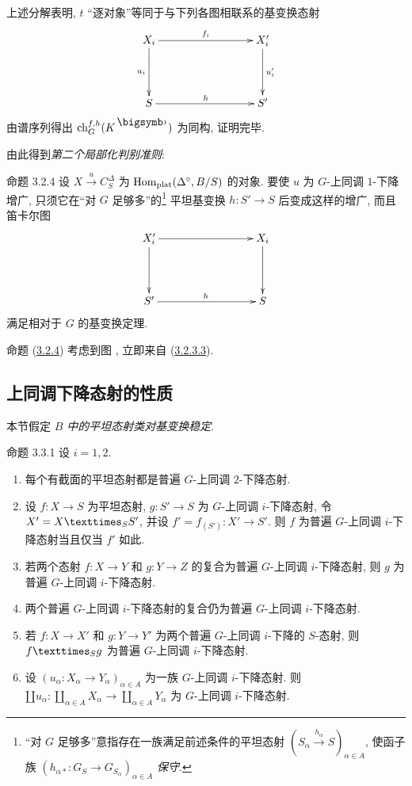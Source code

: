 上述分解表明, $t$ “逐对象”等同于与下列各图相联系的基变换态射
\[
\xymatrix@C=3cm@R=1.5cm{
X_i\ar[d]_{u_i}\ar[r]^{f_i}&X'_i\ar[d]^{u'_i}\\
S\ar[r]^{h}&S'
}
\]
由谱序列得出 $\ch_G^{f,h}(K^{\bigdot})$ 为同构, 证明完毕.

由此得到\emph{第二个局部化判别准则}:

\begin{enonce*}{命题 3.2.4}
设 $X\xrightarrow{u}C^{\Delta}_S$ 为 $\operatorname{Hom}_{\operatorname{plat}}(\Delta^{\circ},B/S)$ 的对象.
要使 $u$ 为 $G$-上同调 $1$-下降增广,
只须它在“对 $G$ 足够多”的\footnote{“对 $G$ 足够多”意指存在一族满足前述条件的平坦态射
$(S_{\alpha}\xrightarrow{h_{\alpha}}S)_{\alpha\in A}$,
使函子族 $(h_{\alpha\ast}:G_S\to G_{S_\alpha})_{\alpha\in A}$ \emph{保守}.}
平坦基变换 $h:S'\to S$ 后变成这样的增广, 而且笛卡尔图
\[
\xymatrix@C=3cm@R=1.5cm{
X'_i\ar[d]\ar[r]&X_i\ar[d]\\
S'\ar[r]^{h}&S
}
\]
满足相对于 $G$ 的基变换定理.
\end{enonce*}

命题\pageoriginale{} (\hyperref[Vbis.prop3.2.4]{3.2.4})
考虑到图 , 立即来自
(\hyperref[Vbis.lem3.2.3.3]{3.2.3.3}).

\subsection{上同调下降态射的性质}

本节假定 \emph{$B$ 中的平坦态射类对基变换稳定}.

\begin{enonce*}{命题 3.3.1}
设 $i=1,2$.
\begin{enumerate}
\renewcommand{\theenumi}{\alph{enumi}}
\renewcommand{\labelenumi}{\theenumi)}
\item 每个有截面的平坦态射都是普遍 $G$-上同调 $2$-下降态射.

\item 设 $f:X\to S$ 为平坦态射, $g:S'\to S$ 为 $G$-上同调 $i$-下降态射,
令 $X'=\fprod{X}{S'}{S}$, 并设 $f'=f_{(S')}:X'\to S'$.
则 $f$ 为普遍 $G$-上同调 $i$-下降态射当且仅当 $f'$ 如此.

\item 若两个态射 $f:X\to Y$ 和 $g:Y\to Z$ 的复合为普遍 $G$-上同调 $i$-下降态射,
则 $g$ 为普遍 $G$-上同调 $i$-下降态射.

\item 两个普遍 $G$-上同调 $i$-下降态射的复合仍为普遍 $G$-上同调 $i$-下降态射.

\item 若 $f:X\to X'$ 和 $g:Y\to Y'$ 为两个普遍 $G$-上同调 $i$-下降的 $S$-态射,
则 $\fprod{f}{g}{S}$ 为普遍 $G$-上同调 $i$-下降态射.

\item 设 $(u_{\alpha}:X_{\alpha}\to Y_{\alpha})_{\alpha\in A}$
为一族 $G$-上同调 $i$-下降态射.
则 $\amalg u_{\alpha}:\amalg_{\alpha\in A}X_{\alpha}\to\amalg_{\alpha\in A}Y_{\alpha}$
为 $G$-上同调 $i$-下降态射.
\end{enumerate}
\end{enonce*}

